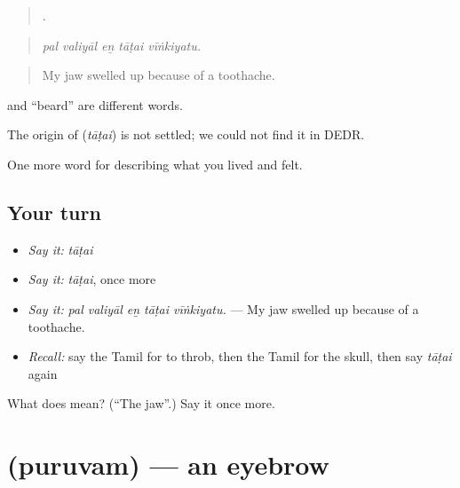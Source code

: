 \begin{quote}
    .
\end{quote}

\begin{quote}
\emph{pal valiyāl eṉ tāṭai vīṅkiyatu.}
\end{quote}

\begin{quote}
My jaw swelled up because of a toothache.
\end{quote}

 and  \textquotedblleft{}beard\textquotedblright{} are different words.

\begin{cousinweb}
The origin of \textbf{} (\emph{tāṭai}) is not settled; we could not find it in DEDR.
\end{cousinweb}

\begin{grammarlens}[title={What you've built}]
One more word for describing what you lived and felt.
\end{grammarlens}

\subsection*{Your turn}
\begin{itemize}
\raggedright
  \item \emph{Say it:} \emph{tāṭai}
  \item \emph{Say it:} \emph{tāṭai}, once more
  \item \emph{Say it:} \emph{pal valiyāl eṉ tāṭai vīṅkiyatu.} — My jaw swelled up because of a toothache.
  \item \emph{Recall:} say the Tamil for to throb, then the Tamil for the skull, then say \emph{tāṭai} again
\end{itemize}

\begin{tcolorbox}[breakable,colback=teal!4,colframe=teal!35!black,title={Before you move on}]
What does  mean? (\textquotedblleft{}The jaw\textquotedblright{}.) Say it once more.
\end{tcolorbox}
\section[\texorpdfstring{\ta{புருவம்} (puruvam)}{புருவம் (puruvam)}]{ (puruvam) — an eyebrow}

\label{lesson:TA-C480-puruvam}



